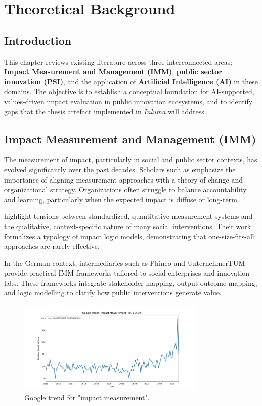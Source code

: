 \chapter{Theoretical Background}\label{ch:theoretical-background}

\section{Introduction}\label{sec:introduction}
This chapter reviews existing literature across three interconnected areas: \textbf{Impact Measurement and Management (IMM)}, \textbf{public sector innovation (PSI)}, and the application of \textbf{Artificial Intelligence (AI)} in these domains.
The objective is to establish a conceptual foundation for AI-supported, values-driven impact evaluation in public innovation ecosystems, and to identify gaps that the thesis artefact implemented in \textit{Inluma} will address.

\section{Impact Measurement and Management (IMM)}\label{sec:imm}
The measurement of impact, particularly in social and public sector contexts, has evolved significantly over the past decades.
Scholars such as \textcite{ebrahim2014measuring} emphasize the importance of aligning measurement approaches with a theory of change and organizational strategy.
Organizations often struggle to balance accountability and learning, particularly when the expected impact is diffuse or long-term.

\textcite{nicholls2012measuring} highlight tensions between standardized, quantitative measurement systems and the qualitative, context-specific nature of many social interventions.
Their work formalizes a typology of impact logic models, demonstrating that one-size-fits-all approaches are rarely effective.

In the German context, intermediaries such as Phineo and UnternehmerTUM provide practical IMM frameworks tailored to social enterprises and innovation labs.
These frameworks integrate stakeholder mapping, output-outcome mapping, and logic modelling to clarify how public interventions generate value.

\begin{figure}[H]
    \centering
    \includegraphics[width = 0.8\textwidth]{../fig/google_trend_impact}
    \caption{Google trend for "impact measurement".}
    \label{fig:trend_impact}
\end{figure}

